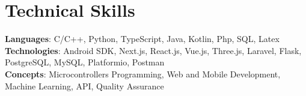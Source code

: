 \section{Technical Skills}
    \begin{itemize}[leftmargin=0.15in, label={}]
	\small{\item{
		\textbf{Languages}{: C/C++, Python, TypeScript, Java, Kotlin, Php, SQL, Latex} \\
		\textbf{Technologies}{: Android SDK, Next.js, React.js, Vue.js, Three.js, Laravel, Flask, PostgreSQL, MySQL, Platformio, Postman} \\
		\textbf{Concepts}{: Microcontrollers Programming, Web and Mobile Development, Machine Learning, API, Quality Assurance}
	}}
    \end{itemize}